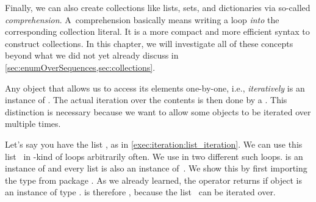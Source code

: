 Finally, we can also create collections like lists, sets, and dictionaries via so-called \emph{comprehension}.
A~comprehension basically means writing a  loop \emph{into} the corresponding collection literal.
It is a more compact and more efficient syntax to construct collections.
In this chapter, we will investigate all of these concepts beyond what we did not yet already discuss in \cref{sec:enumOverSequences,sec:collections}.%
%
%
\label{sec:iterable}%
%
%
%
%
%
%
%
%
%
%
%
%
%
\begin{sloppypar}%
Any object that allows us to access its elements one-by-one, i.e., \emph{iteratively} is an instance of .
The actual iteration over the contents is then done by a .
This distinction is necessary because we want to allow some objects to be iterated over multiple times.%
\end{sloppypar}%
%
Let's say you have the list , as in \cref{exec:iteration:list_iteration}.
We can use this list~ in -kind of loops arbitrarily often.
We use  in two different such  loops.
 is an instance of  and every list is also an instance
of~.
We show this by first importing the type  from package .
As we already learned, the operator  returns  if object  is an instance of type .
 is therefore , because the list~ can be iterated over.

